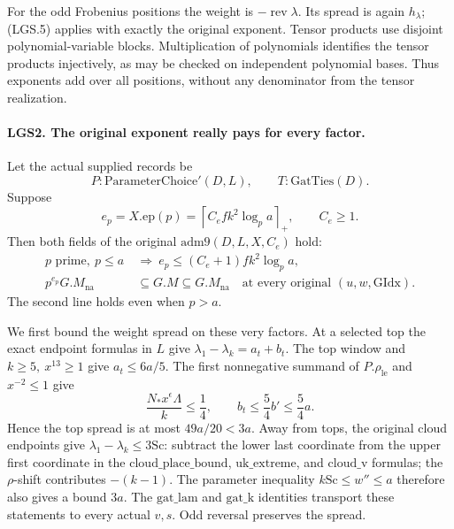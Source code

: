 \documentclass[11pt,a4paper]{article}
\numberwithin{equation}{section}
\theoremstyle{remark}\newtheorem{remark}[theorem]{Remark}
\begin{document}
For the odd Frobenius positions the weight is
\(-\operatorname{rev}\lambda\).  Its spread is again
\(h_\lambda\); (LGS.5) applies with exactly the original exponent.
Tensor products use disjoint polynomial-variable blocks.
Multiplication of polynomials identifies the tensor products
injectively, as may be checked on independent polynomial bases.
Thus exponents add over all positions, without any denominator
from the tensor realization.

\paragraph{LGS2. The original exponent really pays for every factor.}
\label{claim:LGS2}
Let the actual supplied records be
\[
       P:\mathrm{ParameterChoice}'(D,L),\qquad
       T:\mathrm{GatTies}(D).
\]
Suppose
\[
 e_p=X.\mathrm{ep}(p)
       =\left\lceil C_e f k^2\log_p a\right\rceil_+,
       \qquad C_e\ge1.                                  \tag{LGS.6}
\]
Then both fields of the original \(\mathrm{adm9}(D,L,X,C_e)\)
hold:
\[
 \begin{split}
 p\text{ prime},\ p\le a
   &\ \Longrightarrow\
       e_p\le(C_e+1)fk^2\log_p a,\\
 p^{e_p}G.M_{\mathrm{na}}
   &\ \subseteq G.M\subseteq G.M_{\mathrm{na}}
       \quad\text{at every original }(u,w,\mathrm{GIdx}).
 \end{split}                                                     \tag{LGS.7}
\]
The second line holds even when \(p>a\).

We first bound the weight spread on these very factors.
At a selected top the exact endpoint formulas in \(L\) give
\(\lambda_1-\lambda_k=a_t+b_t\).  The top window and
\(k\ge5,\ x^{13}\ge1\) give \(a_t\le6a/5\).
The first nonnegative summand of \(P.\rho_{\mathrm{le}}\)
and \(x^{-2}\le1\) give
\[
 \frac{N_*x^\epsilon\Lambda}{k}\le\frac14,\qquad
 b_t\le\frac54 b'\le\frac54a.
 \]
Hence the top spread is at most \(49a/20<3a\).
Away from tops, the original cloud endpoints give
\(\lambda_1-\lambda_k\le3\mathrm{Sc}\): subtract the lower
last coordinate from the upper first coordinate in the
\(\mathrm{cloud\_\allowbreak place\_\allowbreak bound}\),
\(\mathrm{uk\_\allowbreak extreme}\), and \(\mathrm{cloud\_\allowbreak v}\) formulas;
the \(\rho\)-shift contributes \(-(k-1)\).
The parameter inequality \(k\mathrm{Sc}\le w''\le a\)
therefore also gives a bound \(3a\).
The \(\mathrm{gat\_\allowbreak lam}\) and \(\mathrm{gat\_\allowbreak k}\) identities
transport these statements to every actual \(v,s\).
Odd reversal preserves the spread.
\end{document}
